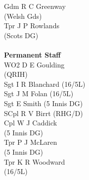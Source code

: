 \begin{multicols}{4}
  Gdm R C Greenway \\ \indent (Welsh Gds) \\
  Tpr J P Rowlands \\ \indent (Scots DG) \\
  \\
  \textbf{Permanent Staff} \\
  WO2 D E Goulding \\ \indent (QRIH) \\
  Sgt I R Blanchard (16/5L) \\
  Sgt J M Folan (16/5L) \\
  Sgt E Smith (5 Innis DG) \\
  SCpl R V Birrt (RHG/D) \\
  Cpl W J Caddick \\ \indent (5 Innis DG) \\
  Tpr P J McLaren \\ \indent (5 Innis DG) \\
  Tpr K R Woodward \\ \indent (16/5L)
\end{multicols}

\pagebreak
